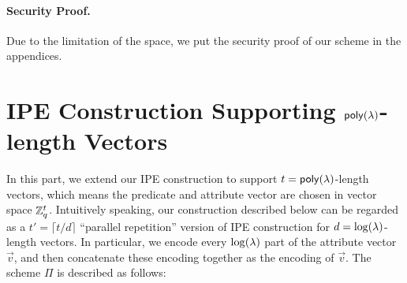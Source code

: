 \paragraph{Security Proof.} Due to the limitation of the space, we put the security proof of our scheme in the appendices.


\section{IPE Construction Supporting $\mathsf{poly}(\lambda)$-length Vectors} \label{sec:poly}
In this part, we extend our IPE construction to support $t = \mathsf{poly}(\lambda)$-length vectors, which means the predicate and attribute vector are chosen in vector space $\mathbb{Z}_q^t$. Intuitively speaking, our construction described below can be regarded as a $t' = \lceil t / d \rceil$ ``parallel repetition'' version of IPE construction for $d = \log(\lambda)$-length vectors. In particular, we encode every $\log(\lambda)$ part of the attribute vector $\vec{v}$, and then concatenate these encoding together as the encoding of $\vec{v}$. The scheme $\Pi$ is described as follows:
